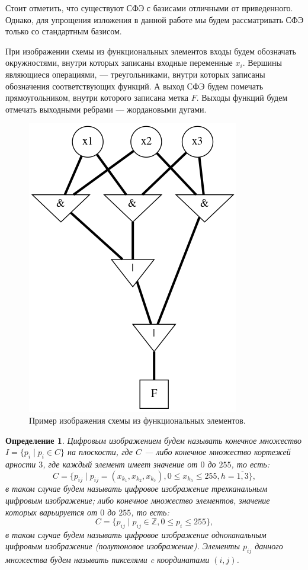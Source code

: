 \documentclass[makeidx, a4paper, 14pt]{extarticle}
\newcommand{\Z}{\mathbb{Z}}
\newtheorem{definition}{Определение}
\begin{document}
Стоит отметить, что существуют СФЭ с базисами отличными от приведенного. Однако, для упрощения изложения в данной работе мы будем рассматривать СФЭ
только со стандартным базисом.

При изображении схемы из функциональных элементов входы будем обозначать окружностями, внутри которых записаны входные переменные $x_i$.
Вершины являющиеся операциями, --- треугольниками, внутри которых записаны обозначения соответствующих функций.
А выход СФЭ будем помечать прямоугольником, внутри которого записана метка $F$. Выходы функций будем отмечать
выходными ребрами --- жордановыми дугами.

\begin{figure}[!h]
    \centering
    \includegraphics[scale=0.75]{img4.png}
    \caption{Пример изображения схемы из функциональных элементов.}
\end{figure}

\begin{definition}
    Цифровым изображением будем называть конечное множество ${I = \{p_i \mid p_i \in C\}}$ на плоскости,
    где $C$ --- либо конечное множество кортежей арности $3$, где каждый элемент имеет значение от $0$ до $255$,
    то есть: \[ {C=\{p_{ij} \mid p_{ij}=({x_{k_1}}, {x_{k_2}}, {x_{k_3}}), 0 \leq {x_{k_h}} \leq 255, h=\overline{1,3}\}}, \]
    в таком случае будем называть цифровое изображение трехканальным цифровым изображение;
    либо конечное множество элементов, значение которых варьируется от $0$ до $255$, то есть: \[ {C=\{p_{ij} \mid p_{ij} \in \Z, 0 \leq p_i \leq 255\}}, \]
    в таком случае будем называть цифровое изображение одноканальным цифровым изображение (полутоновое изображение).
    Элементы $p_{ij}$ данного множества будем называть пикселями c координатами $(i, j)$.
\end{definition}
\end{document}
